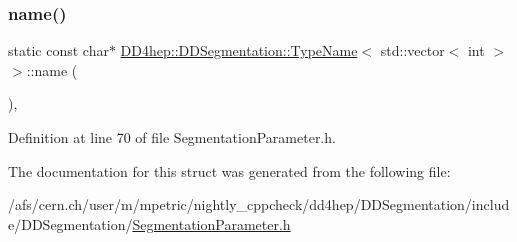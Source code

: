 \subsubsection{\texorpdfstring{name()}{name()}}
{\footnotesize\ttfamily static const char$\ast$ \hyperlink{struct_d_d4hep_1_1_d_d_segmentation_1_1_type_name}{D\+D4hep\+::\+D\+D\+Segmentation\+::\+Type\+Name}$<$ std\+::vector$<$ int $>$ $>$\+::name (\begin{DoxyParamCaption}{ }\end{DoxyParamCaption})\hspace{0.3cm}{\ttfamily [inline]}, {\ttfamily [static]}}



Definition at line 70 of file Segmentation\+Parameter.\+h.



The documentation for this struct was generated from the following file\+:\begin{DoxyCompactItemize}
\item 
/afs/cern.\+ch/user/m/mpetric/nightly\+\_\+cppcheck/dd4hep/\+D\+D\+Segmentation/include/\+D\+D\+Segmentation/\hyperlink{_segmentation_parameter_8h}{Segmentation\+Parameter.\+h}\end{DoxyCompactItemize}
